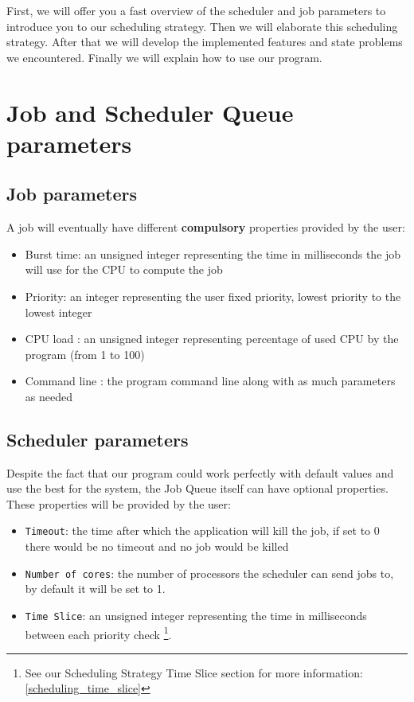 \documentclass[a4paper,11pt]{article}
\begin{document}
First, we will offer you a fast overview of the scheduler and job parameters to introduce you to our scheduling strategy. Then we will elaborate this scheduling strategy. After that we will develop the implemented features and state problems we encountered. Finally we will explain how to use our program.

\newpage

\section{Job and Scheduler Queue parameters}

\subsection{Job parameters}\label{job_parameters}

A job will eventually have different \textbf{compulsory} properties provided by the user:

\begin{itemize}
\item Burst time: an unsigned integer representing the time in milliseconds the job will use for the CPU to compute the job
\item Priority: an integer representing the user fixed priority, lowest priority to the lowest integer
\item CPU load : an unsigned integer representing percentage of used CPU by the program (from 1 to 100)
\item Command line : the program command line along with as much parameters as needed
\end{itemize}

\subsection{Scheduler parameters}

Despite the fact that our program could work perfectly with default values and use the best for the system, the Job Queue itself can have optional properties. These properties will be provided by the user:
\begin{itemize}
\item \texttt{Timeout}: the time after which the application will kill the job, if set to 0 there would be no timeout and no job would be killed
\item \texttt{Number of cores}: the number of processors the scheduler can send jobs to, by default it will be set to 1.
\item \texttt{Time Slice}: an unsigned integer representing the time in milliseconds between each priority check \footnote{See our Scheduling Strategy Time Slice section for more information: \ref{scheduling_time_slice}}.
\end{itemize}
\end{document}
